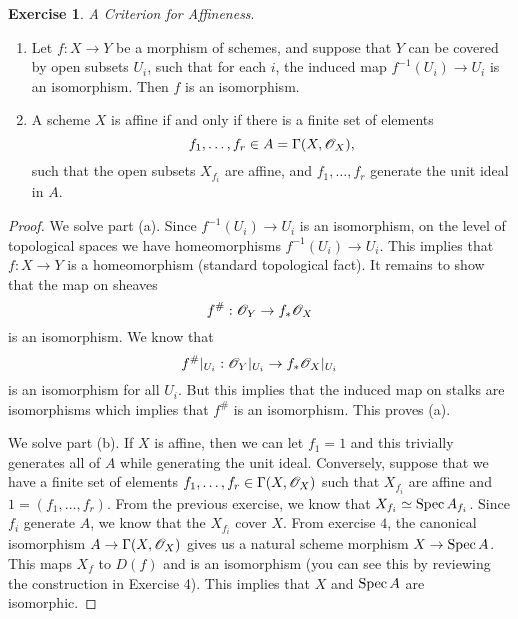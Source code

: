 \documentclass[]{pcmi}
\theoremstyle{plain}
\theoremstyle{definition}
\newtheorem{Exercise}{Exercise}
\theoremstyle{remark}
\begin{document}
\begin{Exercise}
    \emph{A Criterion for Affineness}.
    \begin{enumerate}[label = (\alph*)]
        \item Let $f : X \to Y$ be a morphism of schemes, and suppose that $Y$ can be covered by open subsets $U_i$, such that for each $i$, the induced map $f^{-1}(U_i) \to U_i$ is an isomorphism. Then $f$ is an isomorphism. 
        \item A scheme $X$ is affine if and only if there is a finite set of elements 
        \[
            f_1, \ldots, f_r \in A = \Gamma(X, \mathscr{O}_X),
        \] 
        such that the open subsets $X_{f_i}$ are affine, and $f_1, \ldots, f_r$ generate the unit ideal in $A$. 
    \end{enumerate}
\end{Exercise}

\begin{proof}
    We solve part (a). Since $f^{-1}(U_i) \to U_i$ is an isomorphism, on the level of topological spaces we have homeomorphisms $f^{-1}(U_i) \to U_i$. This implies that $f : X \to Y$ is a homeomorphism (standard topological fact). It remains to show that the map on sheaves 
    \[
        f^{\#} : \mathscr{O}_Y \to f_* \mathscr{O}_X
    \]
    is an isomorphism. We know that 
    \[
        f^{\#}|_{U_i} : \mathscr{O}_Y|_{U_i} \to f_* \mathscr{O}_X |_{U_i}
    \]
    is an isomorphism for all $U_i$. But this implies that the induced map on stalks are isomorphisms which implies that $f^{\#}$ is an isomorphism. This proves (a). 

    We solve part (b). If $X$ is affine, then we can let $f_1 = 1$ and this trivially generates all of $A$ while generating the unit ideal. Conversely, suppose that we have a finite set of elements $f_1, \ldots, f_r \in \Gamma(X, \mathscr{O}_X)$ such that $X_{f_i}$ are affine and $1 = (f_1, \ldots, f_r)$. From the previous exercise, we know that $X_{f_i} \simeq \operatorname{Spec} A_{f_i}$. Since $f_i$ generate $A$, we know that the $X_{f_i}$ cover $X$. From exercise $4$, the canonical isomorphism $A \to \Gamma(X, \mathscr{O}_X)$ gives us a natural scheme morphism $X \to \operatorname{Spec} A$. This maps $X_f$ to $D(f)$ and is an isomorphism (you can see this by reviewing the construction in Exercise 4). This implies that $X$ and $\operatorname{Spec} A$ are isomorphic. 
\end{proof}
\end{document}
